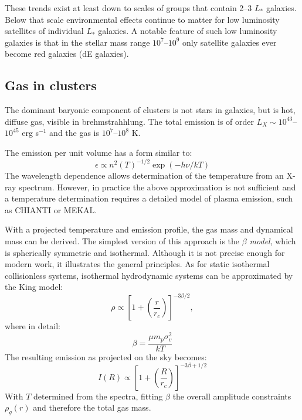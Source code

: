 These trends exist at least down to scales of groups that contain 2--3
$L_\ast$ galaxies. Below that scale environmental effects continue to
matter for low luminosity satellites of individual $L_\ast$
galaxies. A notable feature of such low luminosity galaxies is that in
the stellar mass range $10^7$--$10^9$ only satellite galaxies ever
become red galaxies (dE galaxies).

\subsection{Gas in clusters}

The dominant baryonic component of clusters is not stars in galaxies,
but is hot, diffuse gas, visible in brehmstrahhlung. The total
emission is of order $L_X \sim 10^{43}$--$10^{45}$ erg s$^{-1}$ and
the gas is $10^7$--$10^8$ K.

The emission per unit volume has a form similar to:
\begin{equation}
\epsilon \propto n^2 \left(T\right)^{-1/2} \exp\left(-h\nu / kT\right)
\end{equation}
The wavelength dependence allows determination of the temperature from
an X-ray spectrum.  However, in practice the above approximation is
not sufficient and a temperature determination requires a detailed
model of plasma emission, such as CHIANTI or MEKAL. 

With a projected temperature and emission profile, the gas mass and
dynamical mass can be derived. The simplest version of this approach
is the {\it $\beta$ model}, which is spherically symmetric and
isothermal. Although it is not precise enough for modern work, it
illustrates the general principles.  As for static isothermal
collisionless systems, isothermal hydrodynamic systems can be
approximated by the King model:
\begin{equation}
\rho \propto \left[1+\left(\frac{r}{r_c}\right)\right]^{-3\beta/2},
\end{equation}
where in detail:
\begin{equation}
\beta = \frac{\mu m_p \sigma_v^2}{kT}
\end{equation}
The resulting emission as projected on the sky becomes:
\begin{equation}
I(R) \propto \left[1+\left(\frac{R}{r_c}\right)\right]^{-3\beta + 1/2}
\end{equation}
With $T$ determined from the spectra, fitting $\beta$ the overall
amplitude constraints $\rho_g(r)$ and therefore the total gas mass.

